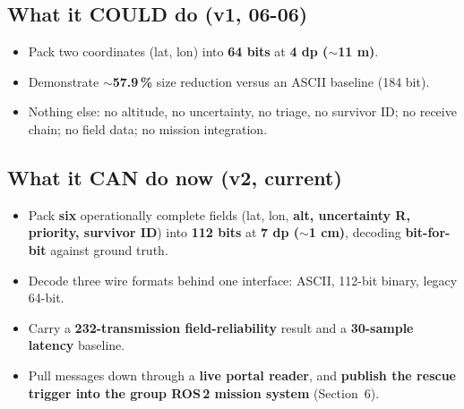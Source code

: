 \documentclass[11pt,a4paper]{article}
\begin{document}
\subsection{What it COULD do (v1, 06-06)}
\begin{itemize}[leftmargin=1.4em,itemsep=1pt]
  \item Pack two coordinates (lat, lon) into \textbf{64 bits} at \textbf{4 dp ($\sim$11 m)}.
  \item Demonstrate \textbf{$\sim$57.9\,\%} size reduction versus an ASCII baseline (184 bit).
  \item Nothing else: no altitude, no uncertainty, no triage, no survivor ID; no receive
        chain; no field data; no mission integration.
\end{itemize}

\subsection{What it CAN do now (v2, current)}
\begin{itemize}[leftmargin=1.4em,itemsep=1pt]
  \item Pack \textbf{six} operationally complete fields (lat, lon, \textbf{alt, uncertainty
        R, priority, survivor ID}) into \textbf{112 bits} at \textbf{7 dp ($\sim$1 cm)},
        decoding \textbf{bit-for-bit} against ground truth.
  \item Decode three wire formats behind one interface: ASCII, 112-bit binary, legacy 64-bit.
  \item Carry a \textbf{232-transmission field-reliability} result and a \textbf{30-sample
        latency} baseline.
  \item Pull messages down through a \textbf{live portal reader}, and \textbf{publish the
        rescue trigger into the group ROS\,2 mission system} (Section~6).
\end{itemize}
\end{document}
